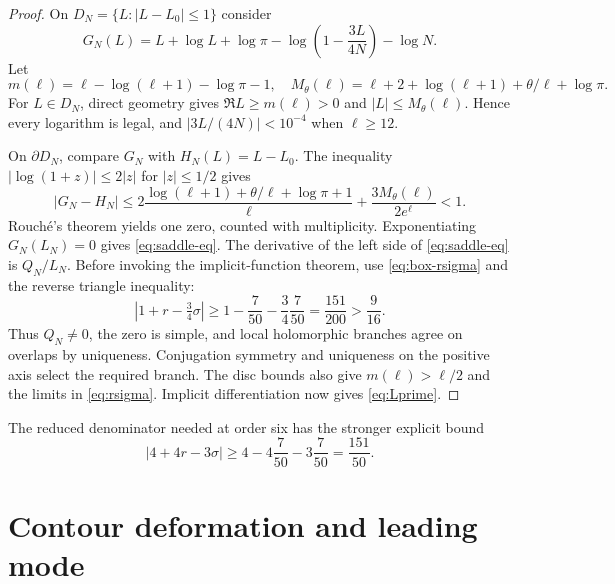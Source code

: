 \documentclass[12pt]{article}
\begin{document}
\begin{proof}
On $D_N=\{L:|L-L_0|\le1\}$ consider
\[
 G_N(L)=L+\log L+\log\pi
 -\log\left(1-\frac{3L}{4N}\right)-\log N.
\]
Let
\[
 m(\ell)=\ell-\log(\ell+1)-\log\pi-1,
\quad
 M_\theta(\ell)=\ell+2+\log(\ell+1)+\theta/\ell+\log\pi.
\]
For $L\in D_N$, direct geometry gives
$\Re L\ge m(\ell)>0$ and $|L|\le M_\theta(\ell)$.  Hence every logarithm is
legal, and $|3L/(4N)|<10^{-4}$ when $\ell\ge12$.

On $\partial D_N$, compare $G_N$ with $H_N(L)=L-L_0$.  The inequality
$|\log(1+z)|\le2|z|$ for $|z|\le1/2$ gives
\begin{equation}\label{eq:rouche-sum}
 |G_N-H_N|
 \le 2\frac{\log(\ell+1)+\theta/\ell+\log\pi+1}{\ell}
 +\frac{3M_\theta(\ell)}{2e^\ell}<1.
\end{equation}
Rouch\'e's theorem yields one zero, counted with multiplicity.  Exponentiating
$G_N(L_N)=0$ gives \eqref{eq:saddle-eq}.  The derivative of the left side of
\eqref{eq:saddle-eq} is $Q_N/L_N$.  Before invoking the implicit-function
theorem, use \eqref{eq:box-rsigma} and the reverse triangle inequality:
\[
 |1+r-\tfrac34\sigma|
 \ge1-\frac7{50}-\frac34\frac7{50}
 =\frac{151}{200}>\frac9{16}.
\]
Thus $Q_N\ne0$, the zero is simple, and local holomorphic branches agree on
overlaps by uniqueness.  Conjugation symmetry and uniqueness on the positive
axis select the required branch.  The disc bounds also give
$m(\ell)>\ell/2$ and the limits in \eqref{eq:rsigma}.  Implicit
differentiation now gives \eqref{eq:Lprime}.
\end{proof}

The reduced denominator needed at order six has the stronger explicit bound
\begin{equation}\label{eq:reduced-denominator}
 |4+4r-3\sigma|\ge4-4\frac7{50}-3\frac7{50}=\frac{151}{50}.
\end{equation}

\section{Contour deformation and leading mode}\label{sec:contour}
\end{document}
